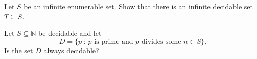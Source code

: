 \documentclass[addpoints]{exam}
\begin{document}
  \pagestyle{headandfoot}
  \runningheadrule

  \firstpagefooter{}{}{}
  \runningfooter{}{}{}
  \begin{flushright}

    \vspace{0.2in}
  \end{flushright}

  \begin{questions}
    \question[10]
      Let $S$ be an infinite enumerable set. Show that there is an infinite decidable 
			set $T \subseteq S$.

      \begin{solution}[\stretch{1}]
      \end{solution}
      \newpage
    \question[10]
      Let $S \subseteq \mathbb{N}$ be decidable and let
			\[
			  D = \{p ~:~ p \text{ is prime and } p \text{ divides some } n \in S\}.
			\]
			Is the set $D$ always decidable?

      \begin{solution}[\stretch{1}]
      \end{solution}
      \newpage
  \end{questions}
\end{document}
